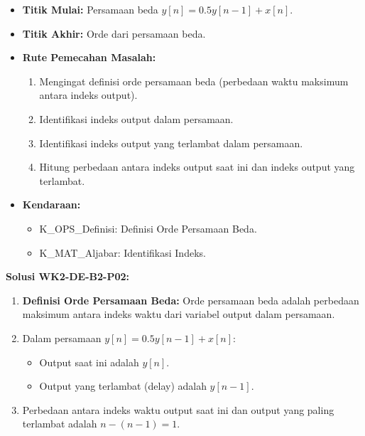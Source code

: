 \documentclass[
  letterpaper,
  DIV=11,
  numbers=noendperiod]{scrreprt}
\providecommand{\tightlist}{%
  \setlength{\itemsep}{0pt}\setlength{\parskip}{0pt}}
\begin{document}
\begin{itemize}
\tightlist
\item
  \textbf{Titik Mulai:} Persamaan beda \(y[n] = 0.5y[n-1] + x[n]\).
\item
  \textbf{Titik Akhir:} Orde dari persamaan beda.
\item
  \textbf{Rute Pemecahan Masalah:}

  \begin{enumerate}
  \def\labelenumi{\arabic{enumi}.}
  \tightlist
  \item
    Mengingat definisi orde persamaan beda (perbedaan waktu maksimum
    antara indeks output).
  \item
    Identifikasi indeks output dalam persamaan.
  \item
    Identifikasi indeks output yang terlambat dalam persamaan.
  \item
    Hitung perbedaan antara indeks output saat ini dan indeks output
    yang terlambat.
  \end{enumerate}
\item
  \textbf{Kendaraan:}

  \begin{itemize}
  \tightlist
  \item
    K\_OPS\_Definisi: Definisi Orde Persamaan Beda.
  \item
    K\_MAT\_Aljabar: Identifikasi Indeks.
  \end{itemize}
\end{itemize}

\textbf{Solusi WK2-DE-B2-P02:}

\begin{enumerate}
\def\labelenumi{\arabic{enumi}.}
\tightlist
\item
  \textbf{Definisi Orde Persamaan Beda:} Orde persamaan beda adalah
  perbedaan maksimum antara indeks waktu dari variabel output dalam
  persamaan.
\item
  Dalam persamaan \(y[n] = 0.5y[n-1] + x[n]\):

  \begin{itemize}
  \tightlist
  \item
    Output saat ini adalah \(y[n]\).
  \item
    Output yang terlambat (delay) adalah \(y[n-1]\).
  \end{itemize}
\item
  Perbedaan antara indeks waktu output saat ini dan output yang paling
  terlambat adalah \(n - (n-1) = 1\).
\end{enumerate}
\end{document}
